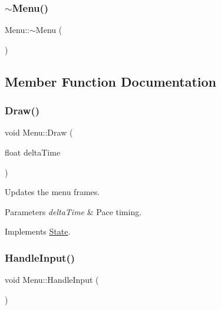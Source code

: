 \mbox{\label{classMenu_a831387f51358cfb88cd018e1777bc980}} 
\subsubsection{\texorpdfstring{$\sim$\+Menu()}{~Menu()}}
{\footnotesize\ttfamily Menu\+::$\sim$\+Menu (\begin{DoxyParamCaption}{ }\end{DoxyParamCaption})}



\subsection{Member Function Documentation}
\mbox{\label{classMenu_a510885af1fe41d02c1669fca278f7eed}} 
\subsubsection{\texorpdfstring{Draw()}{Draw()}}
{\footnotesize\ttfamily void Menu\+::\+Draw (\begin{DoxyParamCaption}\item[{float}]{delta\+Time }\end{DoxyParamCaption})\hspace{0.3cm}{\ttfamily [virtual]}}



Updates the menu frames. 


\begin{DoxyParams}{Parameters}
{\em delta\+Time} & Pace timing. \\
\hline
\end{DoxyParams}


Implements \mbox{\hyperlink{classState_ae3bc988c6103665bca68560742fb40e1}{State}}.

\mbox{\label{classMenu_a0cb3596524ed7fd021f999860b563bf8}} 
\subsubsection{\texorpdfstring{Handle\+Input()}{HandleInput()}}
{\footnotesize\ttfamily void Menu\+::\+Handle\+Input (\begin{DoxyParamCaption}{ }\end{DoxyParamCaption})\hspace{0.3cm}{\ttfamily [virtual]}}



